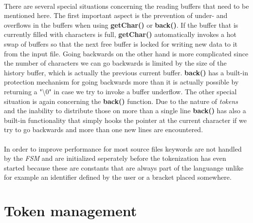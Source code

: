   	\paragraph{}
  		There are several special situations concerning the reading buffers that need to be mentioned here. The first important aspect is the prevention of under- and overflows in the buffers when using \textbf{getChar()} or \textbf{back()}. If the buffer that is currently filled with characters is full, \textbf{getChar()} automatically invokes a hot swap of buffers so that the next free buffer is locked for writing new data to it from the input file. Going backwards on the other hand is more complicated since the number of characters we can go backwards is limited by the size of the history buffer, which is actually the previous current buffer. \textbf{back()} has a built-in protection mechanism for going backwards more than it is actually possible by returning a "\textbackslash 0" in case we try to invoke a buffer underflow. The other special situation is again concerning the \textbf{back()} function. Due to the nature of \textit{tokens} and the inability to distribute those on more than a single line \textbf{back()} has also a built-in functionality that simply hooks the pointer at the current character if we try to go backwards and more than one new lines are encountered.
  	\paragraph{}
  		In order to improve performance for most source files keywords are not handled by the \textit{FSM} and are initialized seperately before the tokenization has even started because these are constants that are always part of the languange unlike for example an identifier defined by the user or a bracket placed somewhere.
  		
	\section{Token management}
